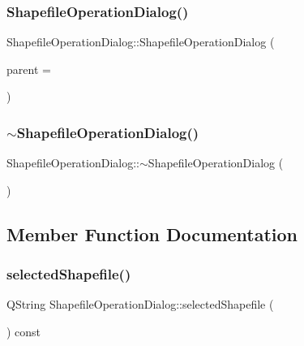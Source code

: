 \subsubsection{\texorpdfstring{ShapefileOperationDialog()}{ShapefileOperationDialog()}}
{\footnotesize\ttfamily Shapefile\+Operation\+Dialog\+::\+Shapefile\+Operation\+Dialog (\begin{DoxyParamCaption}\item[{Q\+Widget $\ast$}]{parent = {} }\end{DoxyParamCaption})\hspace{0.3cm}{\ttfamily [explicit]}}

\mbox{\label{class_shapefile_operation_dialog_a41f7a5f3970c7d1059b4bb3f030485d7}} 
\subsubsection{\texorpdfstring{$\sim$ShapefileOperationDialog()}{~ShapefileOperationDialog()}}
{\footnotesize\ttfamily Shapefile\+Operation\+Dialog\+::$\sim$\+Shapefile\+Operation\+Dialog (\begin{DoxyParamCaption}{ }\end{DoxyParamCaption})}



\subsection{Member Function Documentation}
\mbox{\label{class_shapefile_operation_dialog_ad507475696bfa9d00385a7e6c4ed12bf}} 
\subsubsection{\texorpdfstring{selectedShapefile()}{selectedShapefile()}}
{\footnotesize\ttfamily Q\+String Shapefile\+Operation\+Dialog\+::selected\+Shapefile (\begin{DoxyParamCaption}{ }\end{DoxyParamCaption}) const}


